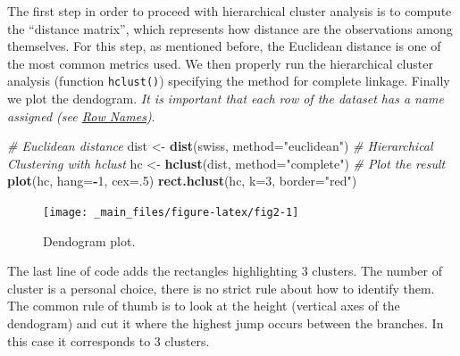 \documentclass[
]{svmono}
\newenvironment{Shaded}{\begin{snugshade}}{\end{snugshade}}
\newcommand{\AttributeTok}[1]{\textcolor[rgb]{0.13,0.29,0.53}{#1}}
\newcommand{\CommentTok}[1]{\textcolor[rgb]{0.56,0.35,0.01}{\textit{#1}}}
\newcommand{\DecValTok}[1]{\textcolor[rgb]{0.00,0.00,0.81}{#1}}
\newcommand{\FunctionTok}[1]{\textcolor[rgb]{0.13,0.29,0.53}{\textbf{#1}}}
\newcommand{\NormalTok}[1]{#1}
\newcommand{\OtherTok}[1]{\textcolor[rgb]{0.56,0.35,0.01}{#1}}
\newcommand{\SpecialCharTok}[1]{\textcolor[rgb]{0.81,0.36,0.00}{\textbf{#1}}}
\newcommand{\StringTok}[1]{\textcolor[rgb]{0.31,0.60,0.02}{#1}}
\begin{document}
The first step in order to proceed with hierarchical cluster analysis is
to compute the ``distance matrix'', which represents how distance are the
observations among themselves. For this step, as mentioned before, the
Euclidean distance is one of the most common metrics used. We then
properly run the hierarchical cluster analysis (function \texttt{hclust()})
specifying the method for complete linkage. Finally we plot the
dendogram. \emph{It is important that each row of the dataset has a name
assigned (see \protect\hyperlink{row-names}{Row Names})}.

\begin{Shaded}
\begin{Highlighting}[]
\CommentTok{\# Euclidean distance}
\NormalTok{dist }\OtherTok{\textless{}{-}} \FunctionTok{dist}\NormalTok{(swiss, }\AttributeTok{method=}\StringTok{"euclidean"}\NormalTok{)}
\CommentTok{\# Hierarchical Clustering with hclust}
\NormalTok{hc }\OtherTok{\textless{}{-}} \FunctionTok{hclust}\NormalTok{(dist, }\AttributeTok{method=}\StringTok{"complete"}\NormalTok{)}
\CommentTok{\# Plot the result}
\FunctionTok{plot}\NormalTok{(hc, }\AttributeTok{hang=}\SpecialCharTok{{-}}\DecValTok{1}\NormalTok{, }\AttributeTok{cex=}\NormalTok{.}\DecValTok{5}\NormalTok{)}
\FunctionTok{rect.hclust}\NormalTok{(hc, }\AttributeTok{k=}\DecValTok{3}\NormalTok{, }\AttributeTok{border=}\StringTok{"red"}\NormalTok{)}
\end{Highlighting}
\end{Shaded}

\begin{figure}[H]
\texttt{[image: \_main\_files/figure-latex/fig2-1]} \caption{Dendogram plot.}\label{fig:fig2}
\end{figure}

The last line of code adds the rectangles highlighting 3 clusters. The
number of cluster is a personal choice, there is no strict rule about
how to identify them. The common rule of thumb is to look at the height
(vertical axes of the dendogram) and cut it where the highest jump
occurs between the branches. In this case it corresponds to 3 clusters.
\end{document}
